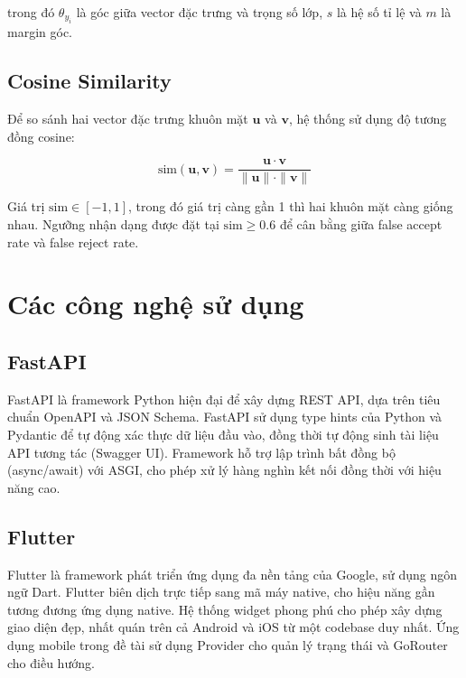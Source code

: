 trong đó $\theta_{y_i}$ là góc giữa vector đặc trưng và trọng số lớp, $s$ là hệ số tỉ lệ và $m$ là margin góc.

\subsection{Cosine Similarity}

Để so sánh hai vector đặc trưng khuôn mặt $\mathbf{u}$ và $\mathbf{v}$, hệ thống sử dụng độ tương đồng cosine:

\begin{equation}
    \text{sim}(\mathbf{u}, \mathbf{v}) = \frac{\mathbf{u} \cdot \mathbf{v}}{\|\mathbf{u}\| \cdot \|\mathbf{v}\|}
\end{equation}

Giá trị $\text{sim} \in [-1, 1]$, trong đó giá trị càng gần 1 thì hai khuôn mặt càng giống nhau. Ngưỡng nhận dạng được đặt tại $\text{sim} \geq 0.6$ để cân bằng giữa false accept rate và false reject rate.



\section{Các công nghệ sử dụng}

\subsection{FastAPI}

FastAPI là framework Python hiện đại để xây dựng REST API, dựa trên tiêu chuẩn OpenAPI và JSON Schema. FastAPI sử dụng type hints của Python và Pydantic để tự động xác thực dữ liệu đầu vào, đồng thời tự động sinh tài liệu API tương tác (Swagger UI). Framework hỗ trợ lập trình bất đồng bộ (async/await) với ASGI, cho phép xử lý hàng nghìn kết nối đồng thời với hiệu năng cao.

\subsection{Flutter}

Flutter là framework phát triển ứng dụng đa nền tảng của Google, sử dụng ngôn ngữ Dart. Flutter biên dịch trực tiếp sang mã máy native, cho hiệu năng gần tương đương ứng dụng native. Hệ thống widget phong phú cho phép xây dựng giao diện đẹp, nhất quán trên cả Android và iOS từ một codebase duy nhất. Ứng dụng mobile trong đề tài sử dụng Provider cho quản lý trạng thái và GoRouter cho điều hướng.

